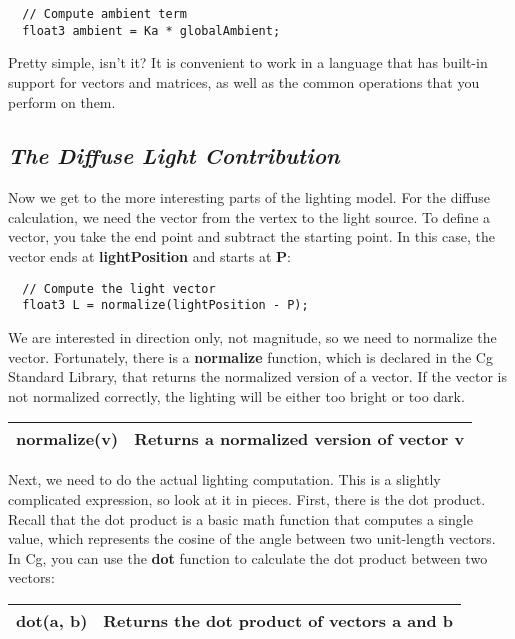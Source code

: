 \documentclass[../main.tex]{subfiles}
\begin{document}
\FloatBarrier
\begin{lstlisting}
  // Compute ambient term
  float3 ambient = Ka * globalAmbient;
\end{lstlisting}
\FloatBarrier

Pretty simple, isn't it? It is convenient to work in a language that has built-in support for vectors and matrices, as well as the common operations that you perform on them.

\subsection*{\textit{The Diffuse Light Contribution}}

Now we get to the more interesting parts of the lighting model. For the diffuse calculation, we need the vector from the vertex to the light source. To define a vector, you take the end point and subtract the starting point. In this case, the vector ends at \textbf{lightPosition} and starts at \textbf{P}:

\FloatBarrier
\begin{lstlisting}
  // Compute the light vector
  float3 L = normalize(lightPosition - P);
\end{lstlisting}
\FloatBarrier

We are interested in direction only, not magnitude, so we need to normalize the vector. Fortunately, there is a \textbf{normalize} function, which is declared in the Cg Standard Library, that returns the normalized version of a vector. If the vector is not normalized correctly, the lighting will be either too bright or too dark.

\FloatBarrier
\begin{table}
\centering
\begin{tabular}{ p{5cm} p{7cm}  } 
\hline
\textbf{normalize(v)} & Returns a normalized version of vector \textbf{v} \\
\hline
\end{tabular}
\end{table}
\FloatBarrier

Next, we need to do the actual lighting computation. This is a slightly complicated expression, so look at it in pieces. First, there is the dot product. Recall that the dot product is a basic math function that computes a single value, which represents the cosine of the angle between two unit-length vectors. In Cg, you can use the \textbf{dot} function to calculate the dot product between two vectors:

\FloatBarrier
\begin{table}
\centering
\begin{tabular}{ p{5cm} p{7cm}  } 
\hline
\textbf{dot(a, b)} & Returns the dot product of vectors \textbf{a} and \textbf{b} \\
\hline
\end{tabular}
\end{table}
\FloatBarrier
\end{document}
